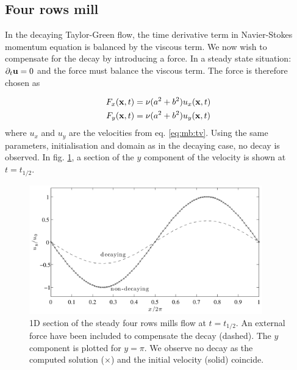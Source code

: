\subsection{Four rows mill}\label{sec:mb:four_rows}
In the decaying Taylor-Green flow, the time derivative term in
Navier-Stokes momentum equation is balanced by the viscous term. We
now wish to compensate for the decay by introducing a force. In a
steady state situation: $\partial_t\mathbf{u} = 0$ and the force must
balance the viscous term. The force is therefore chosen as

\begin{equation}
\begin{aligned}
F_x(\mathbf{x}, t) &= \nu(a^2 + b^2)u_x(\mathbf{x}, t) \\
F_y(\mathbf{x}, t) &= \nu(a^2 + b^2)u_y(\mathbf{x}, t) 
\end{aligned}
\end{equation}
where $u_x$ and $u_y$ are the velocities from
eq. \eqref{eq:mb:tv}. Using the same parameters, initialisation and
domain as in the decaying case, no decay is observed. In
fig. \ref{fig:mb:four_mill}, a section of the $y$ component of the
velocity is shown at $t = t_{1/2}$.

\begin{figure}
\begin{center}
\includegraphics[width=0.9\textwidth]{fig/four_mill.pdf}
\end{center}
\caption{1D section of the steady four rows mills flow at $t =
  t_{1/2}$. An external force have been included to compensate the
  decay (dashed). The $y$ component is plotted for $y = \pi$. We
  observe no decay as the computed solution ($\times$) and the initial
  velocity (solid) coincide.}
\label{fig:mb:four_mill}
\end{figure}


